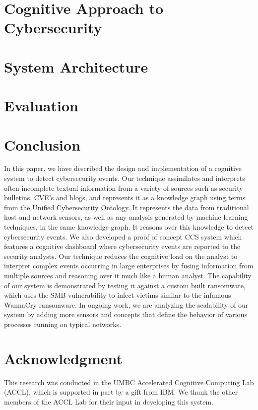 \documentclass[10pt, conference, compsocconf]{IEEEtran}
\begin{document}
\section{Cognitive Approach to Cybersecurity}
\label{CognitiveCyberSecurity}


\section{System Architecture}


\section{Evaluation}


\section{Conclusion}

In this paper, we have described the design and implementation of a cognitive system to detect cybersecurity events. Our technique assimilates and interprets often incomplete textual information from a variety of sources such as security bulletins, CVE's and blogs, and represents it as a knowledge graph using terms from the Unified Cybersecurity Ontology. It represents the data from traditional host and network sensors, as well as any analysis generated by machine learning techniques,  in the same knowledge graph. It reasons over this knowledge to detect cybersecurity events. We also developed a proof of concept CCS system which features a cognitive dashboard where cybersecurity events are reported to the security analysts. Our technique reduces the cognitive load on the analyst to interpret complex events occurring in large enterprises by fusing information from multiple sources and reasoning over it much like a human analyst. The capability of our system is demonstrated by testing it against a custom built ransomware, which uses the SMB vulnerability to infect victims similar to the infamous WannaCry ransomware. In ongoing work, we are
analyzing the scalability of our system by adding more sensors and concepts that define the behavior of various processes running on typical networks. 

\section*{Acknowledgment}
This research was conducted in the UMBC Accelerated Cognitive Computing Lab (ACCL), which is supported in part by a gift from IBM. We thank the other members of the ACCL Lab for their input in developing this system.

{}

\end{document}
